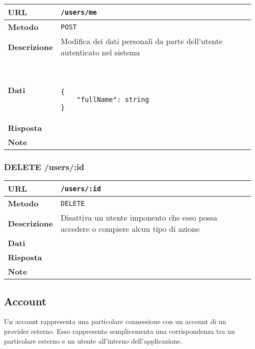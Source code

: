 \documentclass[12pt,a4paper]{article}
\begin{document}
            \begin{tabular}{|l|l|} 
                \hline
                \textbf{URL} & \texttt{/users/me} \\ \hline
                \textbf{Metodo} & \texttt{POST} \\ \hline
                \textbf{Descrizione} & 
                    Modifica dei dati personali da parte dell'utente
                    autenticato nel sistema \\ \hline
                \textbf{Dati} & \
                    \begin{lstlisting}[basicstyle={\ttfamily}]
{
    "fullName": string
}
                    \end{lstlisting} \\ \hline
                \textbf{Risposta} & \\ \hline
                \textbf{Note} & \\ \hline
            \end{tabular}

        \subsubsection{DELETE /users/:id}

            \begin{tabular}{|l|l|} 
                \hline
                \textbf{URL} & \texttt{/users/:id} \\ \hline
                \textbf{Metodo} & \texttt{DELETE} \\ \hline
                \textbf{Descrizione} & 
                    Disattiva un utente imponento che esso possa
                    accedere o compiere alcun tipo di azione \\ \hline
                \textbf{Dati} & \\ \hline
                \textbf{Risposta} & \\ \hline
                \textbf{Note} & \\ \hline
            \end{tabular}

	\subsection{Account}

		\par Un account rappresenta una particolare connessione con un account di un 
        provider esterno. Esso rappresenta semplicementa una corrispondenza tra
        un particolare esterno e un utente all'interno dell'applicazione.
\end{document}
